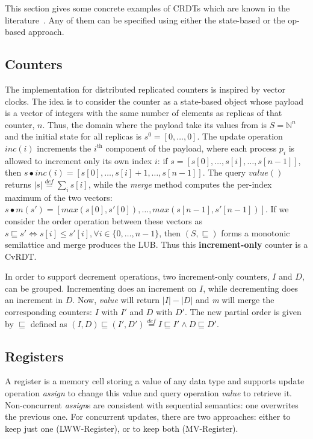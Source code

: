 This section gives some concrete examples of CRDTs which are known in the
literature~\cite{shapiro:inria-00555588}. Any of them can be specified
using either the state-based or the op-based approach.

\subsection{Counters}
\label{sec:counters}

The implementation for distributed replicated counters is inspired by vector
clocks. The idea is to consider the counter as a state-based object whose
payload is a vector of integers with the same number of elements as replicas of
that counter, $n$. Thus, the domain where the payload take its values from is
$S = \mathbb{N}^{n}$ and the initial state for all replicas is $s^{0} =
[0,\ldots,0]$. The update operation $inc(i)$ increments the $i^{\text{th}}$
component of the payload, where each process $p_{i}$ is allowed to increment
only its own index $i$: if $s = [s[0],\ldots,s[i],\ldots,s[n-1]]$, then $s
\bullet inc(i) = [s[0],\ldots,s[i] + 1,\ldots,s[n-1]]$. The query $value()$
returns $|s| \stackrel{def}{=} \sum_{i}s[i]$, while the \textit{merge} method
computes the per-index maximum of the two vectors: $s \bullet m(s') =
[max(s[0],s'[0]),\ldots,max(s[n-1],s'[n-1])]$. If we consider the order
operation between these vectors as $s \sqsubseteq s' \iff s[i] \leq s'[i],
\forall i \in \{0,\ldots,n-1\}$, then $(S,\sqsubseteq)$ forms a
monotonic semilattice and merge produces the LUB. Thus this \textbf{increment-only}
counter is a CvRDT.

In order to support decrement operations, two increment-only counters, $I$ and
$D$, can be grouped. Incrementing does an increment on $I$, while decrementing
does an increment in $D$. Now, \textit{value} will return $|I| - |D|$ and
\textit{m} will merge the corresponding counters: $I$ with $I'$ and $D$ with
$D'$. The new partial order is given by $\sqsubseteq$ defined as $(I,D)
\sqsubseteq (I',D') \stackrel{def}{=} I \sqsubseteq I' \land D \sqsubseteq D'$.

\subsection{Registers}
\label{sec:registers}

A register is a memory cell storing a value of any data type and supports
update operation \textit{assign} to change this value and query operation
\textit{value} to retrieve it. Non-concurrent \textit{assign}s are consistent
with sequential semantics: one overwrites the previous one. For concurrent
updates, there are two approaches: either to keep just one (LWW-Register), or to
keep both (MV-Register). 

